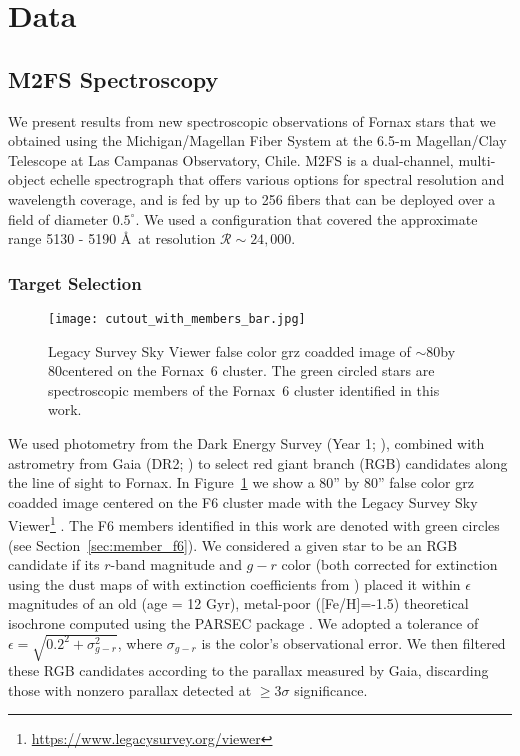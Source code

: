 \documentclass[twocolumn]{aastex63}
\begin{document}
\section{Data}
\label{sec:data}



\subsection{M2FS Spectroscopy}

We present results from new spectroscopic observations of Fornax stars that we obtained using the Michigan/Magellan Fiber System \citep[M2FS;][]{Mateo2012SPIE.8446E..4YM} at the 6.5-m Magellan/Clay Telescope at Las Campanas Observatory, Chile.  
M2FS is a dual-channel, multi-object echelle  spectrograph that offers various options for spectral resolution and wavelength coverage, and is fed by up to 256 fibers that can be deployed over a field of diameter $0.5^{\circ}$.  We used a configuration that covered the approximate range 5130 - 5190 \AA\, at resolution $\mathcal{R}\sim 24,000$.  

\subsubsection{Target Selection}

\begin{figure}
\texttt{[image: cutout\_with\_members\_bar.jpg]}
\caption{Legacy Survey Sky Viewer false color grz coadded image of $\sim$80\arcsec by 80\arcsec  centered on the Fornax~6 cluster. The green circled stars are spectroscopic members of the Fornax~6 cluster identified in this work.}
\label{fig:cutout}
\end{figure}

We used photometry from the Dark Energy Survey (Year 1; \citealt{DES2018ApJS..239...18A_DR1}), combined with astrometry from Gaia (DR2; \citealt{GaiaBrown2018A&A...616A...1G} ) to select red giant branch (RGB) candidates along the line of sight to Fornax.  
In Figure~\ref{fig:cutout} we show a 80'' by 80'' false color grz coadded image centered on the F6 cluster made with the Legacy Survey Sky Viewer\footnote{\url{https://www.legacysurvey.org/viewer}}  \citep{Dey2019AJ....157..168D}.  The F6 members identified in this work are denoted with green circles (see Section~\ref{sec:member_f6}). 
We considered a given star to be an RGB candidate if its  $r$-band magnitude  and $g-r$ color (both corrected for extinction using the dust maps of \citealt{Schlegel1998ApJ...500..525S} with extinction coefficients from  \citealt{DES2018ApJS..239...18A_DR1})
 placed it within $\epsilon$ magnitudes of an old (age = 12 Gyr), metal-poor ([Fe/H]=-1.5) theoretical isochrone computed using the PARSEC package \citep{Bressan2012MNRAS.427..127B}.  We adopted a tolerance of $\epsilon=\sqrt{0.2^2+\sigma_{g-r}^2}$, where $\sigma_{g-r}$ is the color's observational error.  We then filtered these RGB candidates according to the parallax measured by Gaia, discarding those with nonzero parallax detected at $\ge 3\sigma$ significance.  
\end{document}
